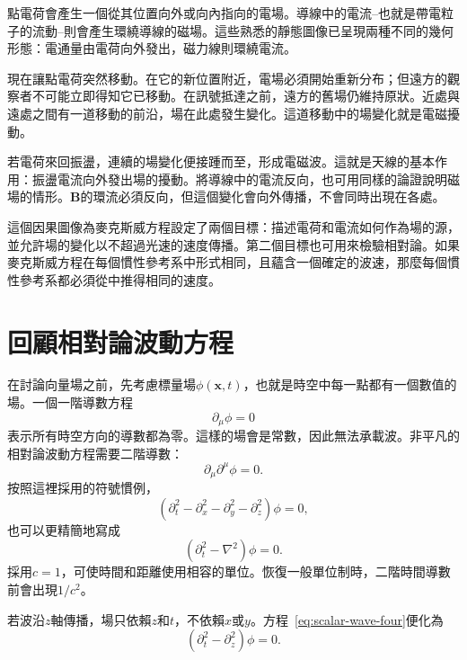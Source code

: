 點電荷會產生一個從其位置向外或向內指向的電場。導線中的電流--也就是帶電粒子的流動--則會產生環繞導線的磁場。這些熟悉的靜態圖像已呈現兩種不同的幾何形態：電通量由電荷向外發出，磁力線則環繞電流。

現在讓點電荷突然移動。在它的新位置附近，電場必須開始重新分布；但遠方的觀察者不可能立即得知它已移動。在訊號抵達之前，遠方的舊場仍維持原狀。近處與遠處之間有一道移動的前沿，場在此處發生變化。這道移動中的場變化就是電磁擾動。

若電荷來回振盪，連續的場變化便接踵而至，形成電磁波。這就是天線的基本作用：振盪電流向外發出場的擾動。將導線中的電流反向，也可用同樣的論證說明磁場的情形。\(\mathbf B\)的環流必須反向，但這個變化會向外傳播，不會同時出現在各處。

這個因果圖像為麥克斯威方程設定了兩個目標：描述電荷和電流如何作為場的源，並允許場的變化以不超過光速的速度傳播。第二個目標也可用來檢驗相對論。如果麥克斯威方程在每個慣性參考系中形式相同，且蘊含一個確定的波速，那麼每個慣性參考系都必須從中推得相同的速度。

\section{回顧相對論波動方程}

在討論向量場之前，先考慮標量場\(\phi(\mathbf x,t)\)，也就是時空中每一點都有一個數值的場。一個一階導數方程
\begin{equation}
\partial_\mu\phi=0
\end{equation}
表示所有時空方向的導數都為零。這樣的場會是常數，因此無法承載波。非平凡的相對論波動方程需要二階導數：
\begin{equation}
\partial_\mu\partial^\mu\phi=0.
\end{equation}
按照這裡採用的符號慣例，
\begin{equation}
\left(\partial_t^2-\partial_x^2-\partial_y^2-\partial_z^2\right)\phi=0,
\label{eq:scalar-wave-four}
\end{equation}
也可以更精簡地寫成
\begin{equation}
\left(\partial_t^2-\nabla^2\right)\phi=0.
\end{equation}
採用\(c=1\)，可使時間和距離使用相容的單位。恢復一般單位制時，二階時間導數前會出現\(1/c^2\)。

若波沿\(z\)軸傳播，場只依賴\(z\)和\(t\)，不依賴\(x\)或\(y\)。方程~\eqref{eq:scalar-wave-four}便化為
\begin{equation}
\left(\partial_t^2-\partial_z^2\right)\phi=0.
\label{eq:scalar-wave-one}
\end{equation}

